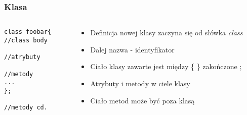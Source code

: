 \documentclass[10pt]{beamer}
\begin{document}
\begin{frame}[fragile]
  \frametitle{Klasa}
  \begin{columns}
    \begin{column}{0.48\textwidth}
\begin{lstlisting}
class foobar{
//class body

//atrybuty

//metody
...
};

//metody cd.

\end{lstlisting}
    \end{column}
    \begin{column}{0.48\textwidth}
      \begin{itemize}
        \item Definicja nowej klasy zaczyna się od słówka \textit{class}
        \item Dalej nazwa - identyfikator
        \item Ciało klasy zawarte jest między \{ \} zakończone ;
        \item Atrybuty i metody w ciele klasy
        \item Ciało metod może być poza klasą
      \end{itemize}
    \end{column}
  \end{columns}
\end{frame}
\end{document}
